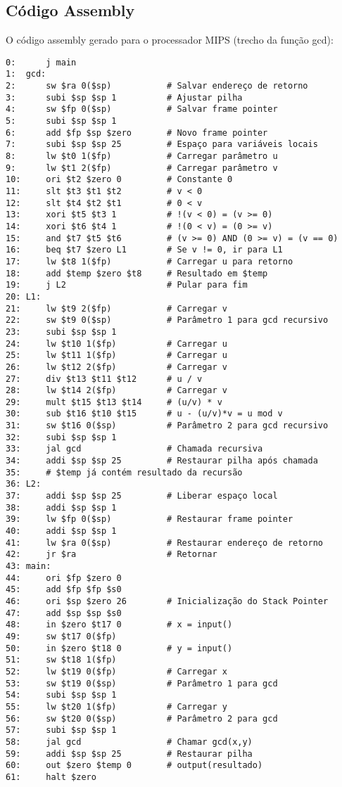 \documentclass[
	12pt,				%
	oneside,
	a4paper,			%
	english,			%
	french,				%
	spanish,			%
	brazil,				%
	]{abntex2}
\begin{document}
\subsection{Código Assembly}

O código assembly gerado para o processador MIPS (trecho da função gcd):

\begin{lstlisting}[style=assemblystyle, caption=Exemplo 2: Código assembly MIPS]
0:      j main
1:  gcd:
2:      sw $ra 0($sp)           # Salvar endereço de retorno
3:      subi $sp $sp 1          # Ajustar pilha
4:      sw $fp 0($sp)           # Salvar frame pointer
5:      subi $sp $sp 1
6:      add $fp $sp $zero       # Novo frame pointer
7:      subi $sp $sp 25         # Espaço para variáveis locais
8:      lw $t0 1($fp)           # Carregar parâmetro u
9:      lw $t1 2($fp)           # Carregar parâmetro v
10:     ori $t2 $zero 0         # Constante 0
11:     slt $t3 $t1 $t2         # v < 0
12:     slt $t4 $t2 $t1         # 0 < v
13:     xori $t5 $t3 1          # !(v < 0) = (v >= 0)
14:     xori $t6 $t4 1          # !(0 < v) = (0 >= v)
15:     and $t7 $t5 $t6         # (v >= 0) AND (0 >= v) = (v == 0)
16:     beq $t7 $zero L1        # Se v != 0, ir para L1
17:     lw $t8 1($fp)           # Carregar u para retorno
18:     add $temp $zero $t8     # Resultado em $temp
19:     j L2                    # Pular para fim
20: L1:
21:     lw $t9 2($fp)           # Carregar v
22:     sw $t9 0($sp)           # Parâmetro 1 para gcd recursivo
23:     subi $sp $sp 1
24:     lw $t10 1($fp)          # Carregar u
25:     lw $t11 1($fp)          # Carregar u
26:     lw $t12 2($fp)          # Carregar v
27:     div $t13 $t11 $t12      # u / v
28:     lw $t14 2($fp)          # Carregar v
29:     mult $t15 $t13 $t14     # (u/v) * v
30:     sub $t16 $t10 $t15      # u - (u/v)*v = u mod v
31:     sw $t16 0($sp)          # Parâmetro 2 para gcd recursivo
32:     subi $sp $sp 1
33:     jal gcd                 # Chamada recursiva
34:     addi $sp $sp 25         # Restaurar pilha após chamada
35:     # $temp já contém resultado da recursão
36: L2:
37:     addi $sp $sp 25         # Liberar espaço local
38:     addi $sp $sp 1
39:     lw $fp 0($sp)           # Restaurar frame pointer
40:     addi $sp $sp 1
41:     lw $ra 0($sp)           # Restaurar endereço de retorno
42:     jr $ra                  # Retornar
43: main:
44:     ori $fp $zero 0
45:     add $fp $fp $s0
46:     ori $sp $zero 26        # Inicialização do Stack Pointer
47:     add $sp $sp $s0
48:     in $zero $t17 0         # x = input()
49:     sw $t17 0($fp)
50:     in $zero $t18 0         # y = input()
51:     sw $t18 1($fp)
52:     lw $t19 0($fp)          # Carregar x
53:     sw $t19 0($sp)          # Parâmetro 1 para gcd
54:     subi $sp $sp 1
55:     lw $t20 1($fp)          # Carregar y
56:     sw $t20 0($sp)          # Parâmetro 2 para gcd
57:     subi $sp $sp 1
58:     jal gcd                 # Chamar gcd(x,y)
59:     addi $sp $sp 25         # Restaurar pilha
60:     out $zero $temp 0       # output(resultado)
61:     halt $zero
\end{lstlisting}
\end{document}
